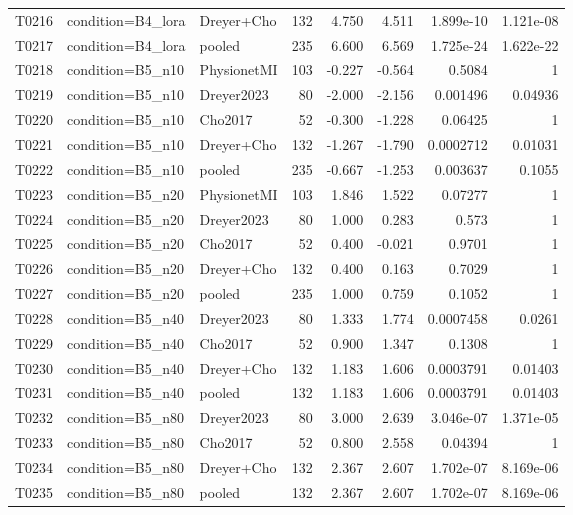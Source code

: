 \begin{longtable}{p{.45in}p{2.6in}p{.75in}rrrrr}
T0216 & condition=B4\_\allowbreak{}lora & Dreyer+Cho & 132 & 4.750 & 4.511 & 1.899e-10 & 1.121e-08 \\
T0217 & condition=B4\_\allowbreak{}lora & pooled & 235 & 6.600 & 6.569 & 1.725e-24 & 1.622e-22 \\
T0218 & condition=B5\_\allowbreak{}n10 & PhysionetMI & 103 & -0.227 & -0.564 & 0.5084 & 1 \\
T0219 & condition=B5\_\allowbreak{}n10 & Dreyer2023 & 80 & -2.000 & -2.156 & 0.001496 & 0.04936 \\
T0220 & condition=B5\_\allowbreak{}n10 & Cho2017 & 52 & -0.300 & -1.228 & 0.06425 & 1 \\
T0221 & condition=B5\_\allowbreak{}n10 & Dreyer+Cho & 132 & -1.267 & -1.790 & 0.0002712 & 0.01031 \\
T0222 & condition=B5\_\allowbreak{}n10 & pooled & 235 & -0.667 & -1.253 & 0.003637 & 0.1055 \\
T0223 & condition=B5\_\allowbreak{}n20 & PhysionetMI & 103 & 1.846 & 1.522 & 0.07277 & 1 \\
T0224 & condition=B5\_\allowbreak{}n20 & Dreyer2023 & 80 & 1.000 & 0.283 & 0.573 & 1 \\
T0225 & condition=B5\_\allowbreak{}n20 & Cho2017 & 52 & 0.400 & -0.021 & 0.9701 & 1 \\
T0226 & condition=B5\_\allowbreak{}n20 & Dreyer+Cho & 132 & 0.400 & 0.163 & 0.7029 & 1 \\
T0227 & condition=B5\_\allowbreak{}n20 & pooled & 235 & 1.000 & 0.759 & 0.1052 & 1 \\
T0228 & condition=B5\_\allowbreak{}n40 & Dreyer2023 & 80 & 1.333 & 1.774 & 0.0007458 & 0.0261 \\
T0229 & condition=B5\_\allowbreak{}n40 & Cho2017 & 52 & 0.900 & 1.347 & 0.1308 & 1 \\
T0230 & condition=B5\_\allowbreak{}n40 & Dreyer+Cho & 132 & 1.183 & 1.606 & 0.0003791 & 0.01403 \\
T0231 & condition=B5\_\allowbreak{}n40 & pooled & 132 & 1.183 & 1.606 & 0.0003791 & 0.01403 \\
T0232 & condition=B5\_\allowbreak{}n80 & Dreyer2023 & 80 & 3.000 & 2.639 & 3.046e-07 & 1.371e-05 \\
T0233 & condition=B5\_\allowbreak{}n80 & Cho2017 & 52 & 0.800 & 2.558 & 0.04394 & 1 \\
T0234 & condition=B5\_\allowbreak{}n80 & Dreyer+Cho & 132 & 2.367 & 2.607 & 1.702e-07 & 8.169e-06 \\
T0235 & condition=B5\_\allowbreak{}n80 & pooled & 132 & 2.367 & 2.607 & 1.702e-07 & 8.169e-06 \\

\end{longtable}
